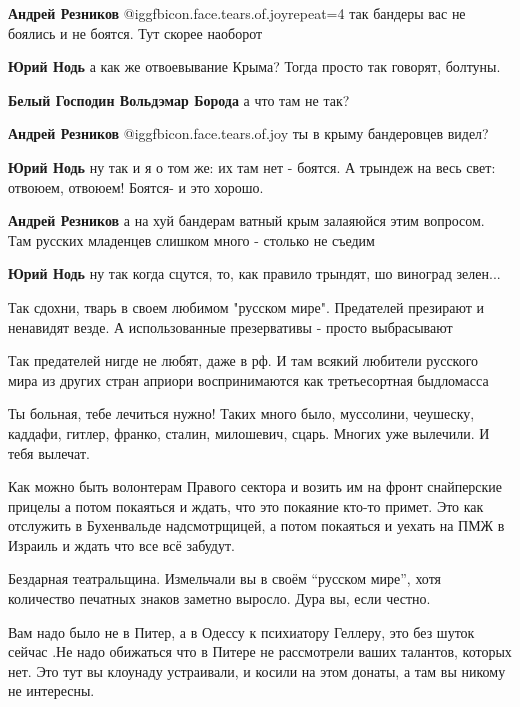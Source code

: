 \begin{itemize}
\begin{itemize}
\textbf{Андрей Резников}  @igg{fbicon.face.tears.of.joy}{repeat=4}  так бандеры вас не боялись и не боятся. Тут скорее наоборот

\textbf{Юрий Нодь} а как же отвоевывание Крыма?
Тогда просто так говорят, болтуны.

\textbf{Белый Господин Вольдэмар Борода} а что там не так?

\textbf{Андрей Резников}  @igg{fbicon.face.tears.of.joy}  ты в крыму бандеровцев видел?

\textbf{Юрий Нодь} ну так и я о том же: их там нет - боятся. А трындеж на весь свет: отвоюем, отвоюем!
Боятся- и это хорошо.

\textbf{Андрей Резников} а на хуй бандерам ватный крым залаяюйся этим вопросом. Там русских младенцев слишком много - столько не съедим

\textbf{Юрий Нодь} ну так когда сцутся, то, как правило трындят, шо виноград зелен...
\end{itemize} %

Так сдохни, тварь в своем любимом "русском мире". Предателей презирают и ненавидят везде. А использованные презервативы - просто выбрасывают

Так предателей нигде не любят, даже в рф. И там всякий любители русского мира из других стран априори воспринимаются как третьесортная быдломасса


Ты больная, тебе лечиться нужно! Таких много
было, муссолини, чеушеску, каддафи, гитлер, франко, сталин, милошевич, сцарь. Многих уже
вылечили. И тебя вылечат.


Как можно быть волонтерам Правого сектора и возить им на фронт снайперские
прицелы а потом покаяться и ждать, что это покаяние кто-то примет. Это как
отслужить в Бухенвальде надсмотрщицей, а потом покаяться и уехать на ПМЖ в
Израиль и ждать что все всё забудут.


Бездарная театральщина. Измельчали вы в своём \enquote{русском мире}, хотя количество
печатных знаков заметно выросло. Дура вы, если честно.


Вам надо было не в Питер, а в Одессу к психиатору Геллеру, это без шуток сейчас
.Не надо обижаться что в Питере не рассмотрели ваших талантов, которых нет. Это
тут вы клоунаду устраивали, и косили на этом донаты, а там вы никому не
интересны.


\end{itemize}
